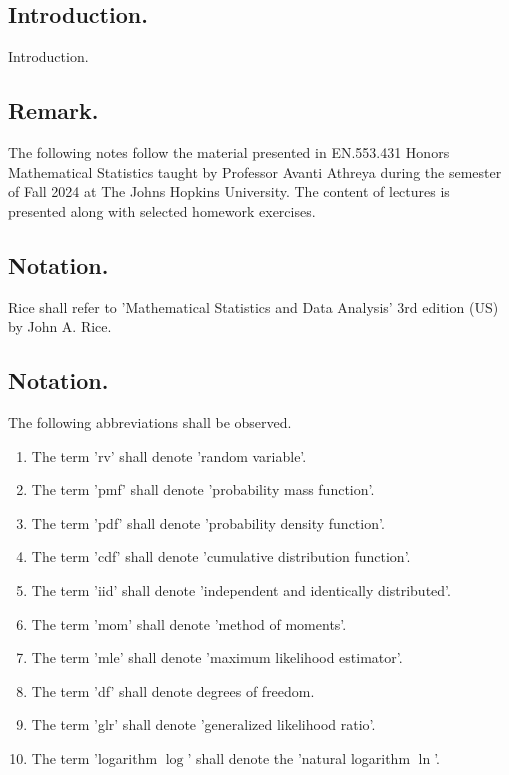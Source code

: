\documentclass[titlepage]{article}
\begin{document}
\maketitle

\tableofcontents

\newpage {}

\subsection{Introduction.} Introduction.

\subsection{Remark.} The following notes follow the material presented in EN.553.431 Honors Mathematical Statistics taught by Professor Avanti Athreya during the semester of Fall 2024 at The Johns Hopkins University. The content of lectures is presented along with selected homework exercises.

\subsection{Notation.} Rice shall refer to 'Mathematical Statistics and Data Analysis' 3rd edition (US) by John A. Rice.

\subsection{Notation.} The following abbreviations shall be observed.
\begin{enumerate}
\item The term 'rv' shall denote 'random variable'.
\item The term 'pmf' shall denote 'probability mass function'.
\item The term 'pdf' shall denote 'probability density function'.
\item The term 'cdf' shall denote 'cumulative distribution function'.
\item The term 'iid' shall denote 'independent and identically distributed'.
\item The term 'mom' shall denote 'method of moments'.
\item The term 'mle' shall denote 'maximum likelihood estimator'.
\item The term 'df' shall denote degrees of freedom.
\item The term 'glr' shall denote 'generalized likelihood ratio'.
\item The term 'logarithm $\log$' shall denote the 'natural logarithm $\ln$'.
\end{enumerate}
\end{document}
